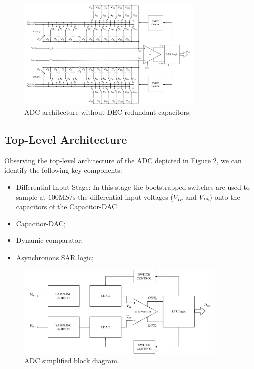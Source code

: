 \begin{figure}[h]
    \centering
    \includegraphics[width=0.8\textwidth]{Images/ADC-arch.png}
    \caption{ADC architecture without DEC redundant capacitors.}
    \label{fig:ADC-sch-no-DEC}
\end{figure}

\subsection{Top-Level Architecture}

Observing the top-level architecture of the ADC depicted in Figure \ref{fig:ADC-block-diagram}, we can identify the following key components:
\begin{itemize}
    \item Differential Input Stage: In this stage the bootstrapped switches are used to sample at $100 \si{\mega S \per \second}$ the differential input voltages ($V_{IP}$ and $V_{IN}$) onto the capacitors of the Capacitor-DAC 
    \item Capacitor-DAC;
    \item Dynamic comparator;
    \item Asynchronous SAR logic;
\end{itemize}

\begin{figure}[H]
    \centering
    \includegraphics[width=0.9\textwidth]{Images/ADC-block-diagram.png}
    \caption{ADC simplified block diagram.}
    \label{fig:ADC-block-diagram}
\end{figure}


